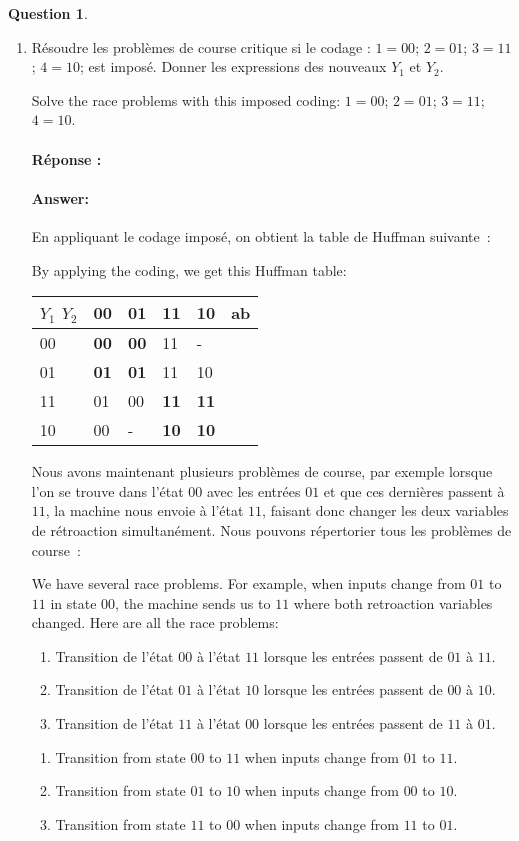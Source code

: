 \documentclass[11pt,a4paper,dvipsnames]{article}
\theoremstyle{definition}%
\newtheorem{Q}{Question}[] %
\newcommand{\reponse}[1]{%
	\ifthenelse {\boolean{corrige}} {\fr{\paragraph{Réponse :}}\en{\paragraph{Answer:}} \color{darkblue}   #1\color{black}} {}
 }
\newcommand{\fr}[1]{
 	\ifthenelse {\boolean{fr}} {#1} {}
 }
\newcommand{\en}[1]{
 	\ifthenelse {\boolean{en}} {#1} {}
 }
\begin{document}
\begin{Q}
\begin{enumerate}
{		}
		\item \fr{Résoudre les problèmes de course critique si le codage : $1 = 00$; $2 = 01$; $3 = 11$; $4 = 10$; est imposé. Donner les expressions des nouveaux $Y_1$ et $Y_2$.}
		\en{Solve the race problems with this imposed coding: $1 = 00$; $2 = 01$; $3 = 11$; $4 = 10$.}

		\reponse{
			\fr{En appliquant le codage imposé, on obtient la table de Huffman suivante~:}
			\en{By applying the coding, we get this Huffman table:}
			\begin{center}
				\begin{tabular}{|l|l|l|l|l|l}
				\hline
				 $Y_1$ $Y_2$ & 00         & 01         & 11         & 10         & \multicolumn{1}{l|}{ab} \\ \hline
				00 & \textbf{00} & \textbf{00} & 11          & -          &    \\ \cline{1-5}
				01 & \textbf{01} & \textbf{01} & 11          & 10          &    \\ \cline{1-5}
				11 & 01          & 00          & \textbf{11} & \textbf{11} &    \\ \cline{1-5}
				10 & 00          & -          & \textbf{10} & \textbf{10} &    \\ \cline{1-5}
				\end{tabular}
			\end{center}

			\fr{Nous avons maintenant plusieurs problèmes de course, par exemple lorsque l'on se trouve dans l'état $00$ avec les entrées $01$ et que ces dernières passent à $11$, la machine nous envoie à l'état $11$, faisant donc changer les deux variables de rétroaction simultanément.
			Nous pouvons répertorier tous les problèmes de course~:}
			\en{We have several race problems.
			For example, when inputs change from $01$ to $11$ in state $00$, the machine sends us to $11$ where both retroaction variables changed.
			Here are all the race problems:}
			\fr{%
			\begin{enumerate}
				\item Transition de l'état $00$ à l'état $11$ lorsque les entrées passent de $01$ à $11$.
				\item Transition de l'état $01$ à l'état $10$ lorsque les entrées passent de $00$ à $10$.
				\item Transition de l'état $11$ à l'état $00$ lorsque les entrées passent de $11$ à $01$.
			\end{enumerate}
			}
			\en{%
			\begin{enumerate}
				\item Transition from state $00$ to $11$ when inputs change from $01$ to $11$.
				\item Transition from state $01$ to $10$ when inputs change from $00$ to $10$.
				\item Transition from state $11$ to $00$ when inputs change from $11$ to $01$.
			\end{enumerate}
			}

}
\end{enumerate}
\end{Q}
\end{document}
